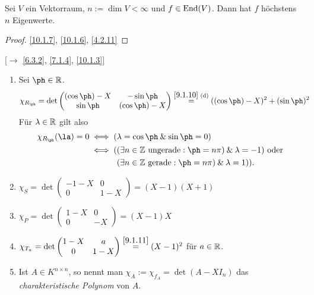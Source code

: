 \documentclass[../../main.tex]{subfiles}
\begin{document}
\begin{kor}\label{10.1.8}
Sei $V$ ein Vektorraum, $n:=\dim V < \infty$ und $f\in \operatorname{End}(V)$. Dann hat $f$ höchstens $n$ Eigenwerte.
\end{kor}
\begin{proof}
\ref{10.1.7}, \ref{10.1.6}, \ref{4.2.11}
\end{proof}

\begin{bsp}\label{10.1.9}
[$\to$ \ref{6.3.2}, \ref{7.1.4}, \ref{10.1.3}]
\begin{enumerate}[\normalfont(a)]
\item Sei $\ph \in \R$.
\begin{align*}{2}
\chi_{R_\ph} & = \det\begin{pmatrix}
(\cos \ph) - X & -\sin \ph\\
\sin \ph & (\cos \ph) -X
\end{pmatrix} \overset{\ref{9.1.10}\text{ (d)}}{=} ((\cos \ph)-X)^2 + (\sin \ph)^2
\end{align*}
Für $\lambda\in \mathbb R$ gilt also
\begin{align*}
\chi_{R_\ph}(\la) = 0 & \iff(\lambda = \cos \ph \et \sin\ph=0)\\
& \iff(
\begin{aligned}[t]
&(\exists n\in \Z\text{ ungerade}: \ph = n\pi)\et \lambda = -1)\text{ oder }\\
&(\exists n\in \Z\text{ gerade}:\ph = n\pi)\et \lambda = 1)).
\end{aligned}
\end{align*}
\item $\chi_S = \det\begin{pmatrix}
-1 - X & 0\\
0 & 1 - X
\end{pmatrix} = (X-1)(X+1)$
\item $\chi_P = \det \begin{pmatrix}
1 - X & 0\\
0 & -X
\end{pmatrix} = (X-1)X$
\item $\chi_{T_a} = \det\begin{pmatrix}
1-X & a\\
0 & 1-X
\end{pmatrix} \overset{\ref{9.1.11}}{=} (X-1)^2$ für $a\in\mathbb R$.
\item Ist $A\in K^{n\times n}$, so nennt man $\chi_A := \chi_{f_A} = \det (A-XI_n)$ das \emph{charakteristische Polynom} von $A$.

\end{enumerate}
\end{bsp}
\end{document}
